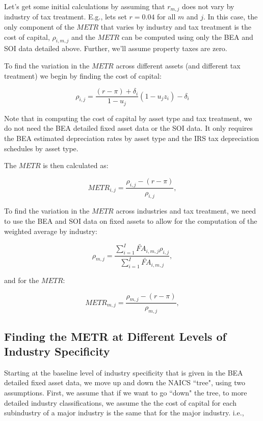 \documentclass[article,11pt,letterpaper,fleqn]{article}
\theoremstyle{definition}
\numberwithin{equation}{section}
\begin{document}
Let's get some initial calculations by assuming that $r_{m,j}$ does not vary by industry of tax treatment.  E.g., lets set $r=0.04$ for all $m$ and $j$.  In this case, the only component of the $METR$ that varies by industry and tax treatment is the cost of capital, $\rho_{i,m,j}$ and the $METR$ can be computed using only the BEA and SOI data detailed above.  Further, we'll assume property taxes are zero.

To find the variation in the $METR$ across different assets (and different tax treatment) we begin by finding the cost of capital:

\begin{equation}
\rho_{i,j} = \frac{(r-\pi)+\delta_{i}}{1-u_{j}}(1-u_{j}z_{i})-\delta_{i}
\end{equation}

Note that in computing the cost of capital by asset type and tax treatment, we do not need the BEA detailed fixed asset data or the SOI data. It only requires the BEA estimated depreciation rates by asset type and the IRS tax depreciation schedules by asset type.

The $METR$ is then calculated as:

\begin{equation}
METR_{i,j} =  \frac{\rho_{i,j} - (r-\pi)}{\rho_{i,j}},
\end{equation}

To find the variation in the $METR$ across industries and tax treatment, we need to use the BEA and SOI data on fixed assets to allow for the computation of the weighted average by industry:

\begin{equation}
\rho_{m,j} = \frac{\sum_{i=1}^{I}\widetilde{FA}_{i,m,j}\rho_{i,j}}{\sum_{i=1}^{I}\widetilde{FA}_{i,m,j}} ,
\end{equation}

and for the $METR$:

\begin{equation}
METR_{m,j} =  \frac{\rho_{m,j} - (r-\pi)}{\rho_{m,j}},
\end{equation}

\subsection{Finding the METR at Different Levels of Industry Specificity}

Starting at the baseline level of industry specificity that is given in the BEA detailed fixed asset data, we move up and down the NAICS ``tree", using two assumptions.  First, we assume that if we want to go ``down" the tree, to more detailed industry classifications, we assume the the cost of capital for each subindustry of a major industry is the same that for the major industry.  i.e., 
\end{document}
